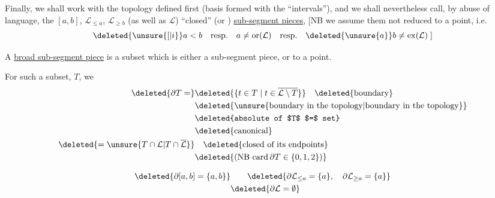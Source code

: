 Finally, we shall work with the topology defined first (basis formed with the ``intervals''), and we shall nevertheless call, by abuse of language, the $[a,b]$, $\mathcal L_{\leq a}$, $\mathcal L_{\geq b}$ (as well as $\mathcal L$) ``closed''  (or ) \uline{sub-segment pieces}, [NB we assume them not reduced to a point, i.e.
\[
\deleted{\unsure{[|i}} a<b\quad \text{resp.}\quad a\ne\mathrm{or}(\mathcal L)\quad \text{resp.}\quad \deleted{\unsure{a}}b\ne\mathrm{ex}(\mathcal L)\;]
\]

A \uline{broad  sub-segment piece} is a  subset which is either a sub-segment piece, or  to a point.

For such a subset, $T$, we
\[
\begin{aligned}
\deleted{\partial T=}&\deleted{\{t\in T\mid t\in \overline{\mathcal L\setminus T}\}}\quad\text{\deleted{boundary}}\\
 &\text{\deleted{\unsure{boundary in the topology|boundary in the topology}}}\\
 &\text{\deleted{absolute of $T$ $=$ set}}\\
 &\text{\deleted{canonical}}\\
 \deleted{={}\unsure{T\cap\mathcal L|T\cap\overline{\mathcal L}}}&\quad\text{\deleted{closed of its endpoints}}\\
 &\deleted{(\mathrm{NB}\ \mathrm{card}\,\partial T\in\{0,1,2\})}
\end{aligned}
\]


\[
\begin{aligned}
 \deleted{\partial[a,b]=\{a,b\}}&\qquad \deleted{\partial \mathcal L_{\leq a}=\{a\},\quad \partial \mathcal L_{\geq a}=\{a\}}\\
 &\deleted{\partial\mathcal L=\emptyset}
\end{aligned}
\]

